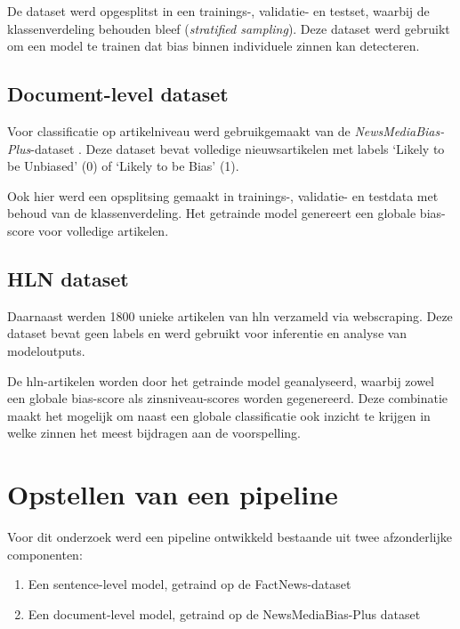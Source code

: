 De dataset werd opgesplitst in een trainings-, validatie- en testset, waarbij de klassenverdeling behouden bleef (\textit{stratified sampling}). Deze dataset werd gebruikt om een model te trainen dat bias binnen individuele zinnen kan detecteren.

\subsection{Document-level dataset}

Voor classificatie op artikelniveau werd gebruikgemaakt van de \textit{NewsMediaBias-Plus}-dataset \autocite{Raza2024}. Deze dataset bevat volledige nieuwsartikelen met labels `Likely to be Unbiased' (0) of `Likely to be Bias' (1).

Ook hier werd een opsplitsing gemaakt in trainings-, validatie- en testdata met behoud van de klassenverdeling. Het getrainde model genereert een globale bias-score voor volledige artikelen.

\subsection{HLN dataset}

Daarnaast werden 1800 unieke artikelen van \gls{hln} verzameld via webscraping. Deze dataset bevat geen labels en werd gebruikt voor inferentie en analyse van modeloutputs.

De \gls{hln}-artikelen worden door het getrainde model geanalyseerd, waarbij zowel een globale bias-score als zinsniveau-scores worden gegenereerd. Deze combinatie maakt het mogelijk om naast een globale classificatie ook inzicht te krijgen in welke zinnen het meest bijdragen aan de voorspelling.

\section{Opstellen van een pipeline}
\label{sec:opstellen-van-een-pipeline}

Voor dit onderzoek werd een pipeline ontwikkeld bestaande uit twee afzonderlijke componenten:

\begin{enumerate}
    \item Een sentence-level model, getraind op de FactNews-dataset
    \item Een document-level model, getraind op de NewsMediaBias-Plus dataset
\end{enumerate}

